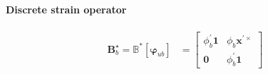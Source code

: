 \paragraph{Discrete strain operator} 
\begin{equation}
   \begin{aligned}
   \bm{B}^{\star}_b = \mathbb{B}^*[\bm{\varphi}^{}_{u b}] 
   &= \begin{bmatrix}
   \phi_b^{\prime} \mathbf{1} & \phi_b \bm{x}^{\prime\times}  \\
   \mathbf{0} & \phi_b^{\prime} \mathbf{1}
   \end{bmatrix} \\
   \end{aligned}
   \label{eq:Bb-svq}
\end{equation}


